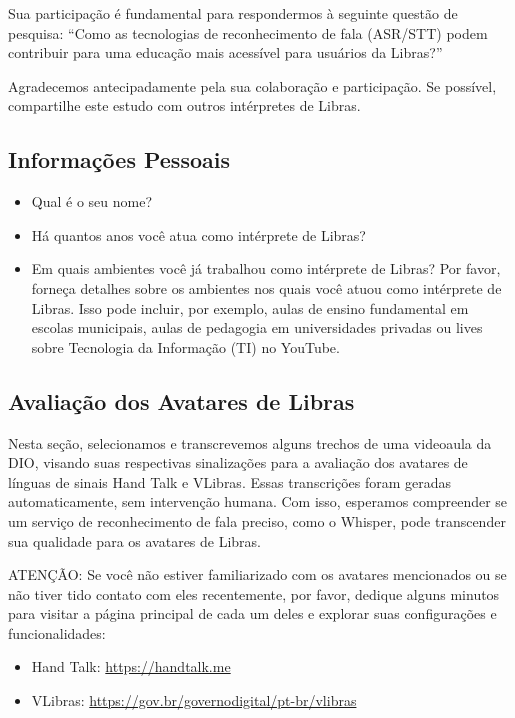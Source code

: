 Sua participação é fundamental para respondermos à seguinte questão de pesquisa: 
“Como as tecnologias de reconhecimento de fala (ASR/STT) podem contribuir para uma 
educação mais acessível para usuários da Libras?”

Agradecemos antecipadamente pela sua colaboração e participação. Se possível, 
compartilhe este estudo com outros intérpretes de Libras.

\subsection{Informações Pessoais}

\begin{itemize}
    \item Qual é o seu nome?
    \item Há quantos anos você atua como intérprete de Libras?
    \item Em quais ambientes você já trabalhou como intérprete de Libras? Por favor, forneça detalhes sobre os ambientes nos quais você atuou como intérprete de Libras. Isso pode incluir, por exemplo, aulas de ensino fundamental em escolas municipais, aulas de pedagogia em universidades privadas ou lives sobre Tecnologia da Informação (TI) no YouTube.
\end{itemize}

\subsection{Avaliação dos Avatares de Libras}

Nesta seção, selecionamos e transcrevemos alguns trechos de uma videoaula da DIO, 
visando suas respectivas sinalizações para a avaliação dos avatares de línguas de sinais 
Hand Talk e VLibras. Essas transcrições foram geradas automaticamente, sem 
intervenção humana. Com isso, esperamos compreender se um serviço de 
reconhecimento de fala preciso, como o Whisper, pode transcender sua qualidade para os 
avatares de Libras.

ATENÇÃO: Se você não estiver familiarizado com os avatares mencionados ou se não 
tiver tido contato com eles recentemente, por favor, dedique alguns minutos para visitar a 
página principal de cada um deles e explorar suas configurações e funcionalidades:

\begin{itemize}
    \item Hand Talk: \url{https://handtalk.me}
    \item VLibras: \url{https://gov.br/governodigital/pt-br/vlibras}
\end{itemize}

